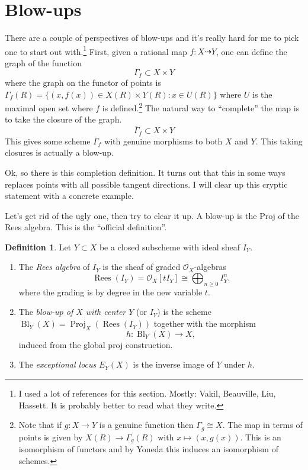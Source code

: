 \documentclass[12pt]{article}
\numberwithin{equation}{section}
\theoremstyle{definition}
\newtheorem{definition}[theorem]{Definition}
\theoremstyle{remark}
\newcommand{\Ocal}{\mathcal{O}}
\newcommand{\Proj}{\operatorname{Proj}}
\newcommand{\Bl}{\operatorname{Bl}}
\newcommand{\Rees}{\operatorname{Rees}}
\begin{document}
\section{Blow-ups}

There are a couple of perspectives of blow-ups and it's really hard for me to pick one to start out with.\footnote{I used a lot of references for this section. Mostly: Vakil, Beauville, Liu, Hassett. It is probably better to read what they write. }
First, given a rational map $f:X \dashrightarrow Y$, one can define the graph of the function 
 $$ \Gamma_f \subset X\times Y $$
where the graph on the functor of points is $\Gamma_f(R) = \lbrace (x,f(x)) \in X(R) \times Y(R) \colon x \in U(R) \rbrace$ where $U$ is the maximal open set where $f$ is defined.\footnote{Note that if $g:X\to Y$ is a genuine function then $\Gamma_g \cong X$. 
	The map in terms of points is given by $X(R)\to \Gamma_g(R)$ with $x\mapsto (x,g(x))$. 
	This is an isomorphism of functors and by Yoneda this induces an isomorphism of schemes.
}
The natural way to ``complete'' the map is to take the closure of the graph. 
 $$ \overline{\Gamma}_f \subset X \times Y$$
This gives some scheme $\overline{\Gamma}_f$ with genuine morphisms to both $X$ and $Y$. 
This taking closures is actually a blow-up. 
 
Ok, so there is this completion definition. 
It turns out that this in some ways replaces points with all possible tangent directions. 
I will clear up this cryptic statement with a concrete example.

Let's get rid of the ugly one, then try to clear it up. 
A blow-up is the Proj of the Rees algebra. 
This is the ``official definition''.
\begin{definition}
	Let $Y \subset X$ be a closed subscheme with ideal sheaf $I_Y$. 
	\begin{enumerate}
	\item The \emph{Rees algebra} of $I_Y$ is the sheaf of graded $\Ocal_X$-algebras 
	 $$ \Rees(I_Y) = \Ocal_X[t I_Y] \cong \bigoplus_{n\geq 0} I_Y^{n}.$$
	 where the grading is by degree in the new variable $t$.
	\item The \emph{blow-up of $X$ with center $Y$} (or $I_Y$) is the scheme $\Bl_Y(X) = \Proj_X(\Rees(I_Y))$ together with the morphism 
	 $$ h: \Bl_Y(X) \to X,$$
	induced from the global proj construction.
	\item The \emph{exceptional locus} $E_Y(X)$ is the inverse image of $Y$ under $h$. 
	\end{enumerate}
\end{definition}
\end{document}
